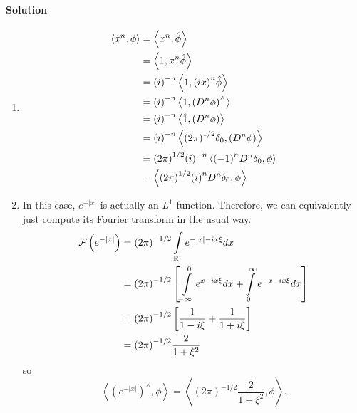 \documentclass[letterpaper,twoside,11pt]{article}
\theoremstyle{mystyle}
\begin{document}
\paragraph*{Solution}
\begin{enumerate}
  \item \begin{align*}
    \left\langle {{{\hat x}^n},\phi } \right\rangle  &= \left\langle {{x^n},\hat \phi } \right\rangle  \hfill \\
     &= \left\langle {1,{x^n}\hat \phi } \right\rangle  \hfill \\
     &= {\left( i \right)^{ - n}}\left\langle {1,{{\left( {ix} \right)}^n}\hat \phi } \right\rangle  \hfill \\
     &= {\left( i \right)^{ - n}}\left\langle {1,{{\left( {{D^n}\phi } \right)}^ \wedge }} \right\rangle  \hfill \\
     &= {\left( i \right)^{ - n}}\left\langle {\hat 1,\left( {{D^n}\phi } \right)} \right\rangle  \hfill \\
     &= {\left( i \right)^{ - n}}\left\langle {{{\left( {2\pi } \right)}^{1/2}}{\delta _0},\left( {{D^n}\phi } \right)} \right\rangle  \hfill \\
     &= {\left( {2\pi } \right)^{1/2}}{\left( i \right)^{ - n}}\left\langle {{{\left( { - 1} \right)}^n}{D^n}{\delta _0},\phi } \right\rangle  \hfill \\
     &= \left\langle {{{\left( {2\pi } \right)}^{1/2}}{{\left( i \right)}^n}{D^n}{\delta _0},\phi } \right\rangle  \hfill \\ 
  \end{align*}
  \item In this case, $e^{-|x|}$ is actually an $L^1$ function. Therefore, we can equivalently just compute its Fourier transform in the usual way. 
  \begin{align*}
    \mathcal{F}\left( {{e^{ - |x|}}} \right) &= {\left( {2\pi } \right)^{ - 1/2}}\int\limits_\mathbb{R} {{e^{ - \left| x \right| - ix\xi }}dx}  \hfill \\
     &= {\left( {2\pi } \right)^{ - 1/2}}\left[ {\int\limits_{ - \infty }^0 {{e^{x - ix\xi }}dx}  + \int\limits_0^\infty  {{e^{ - x - ix\xi }}dx} } \right] \hfill \\
     &= {\left( {2\pi } \right)^{ - 1/2}}\left[ {\frac{1}{{1 - i\xi }} + \frac{1}{{1 + i\xi }}} \right] \hfill \\
     &= {\left( {2\pi } \right)^{ - 1/2}}\frac{2}{{1 + {\xi ^2}}} 
  \end{align*}
  so 
  \[\left\langle {{{\left( {{e^{ - |x|}}} \right)}^ \wedge },\phi } \right\rangle  = \left\langle {{{\left( {2\pi } \right)}^{ - 1/2}}\frac{2}{{1 + {\xi ^2}}},\phi } \right\rangle .\]

\end{enumerate}
\end{document}
